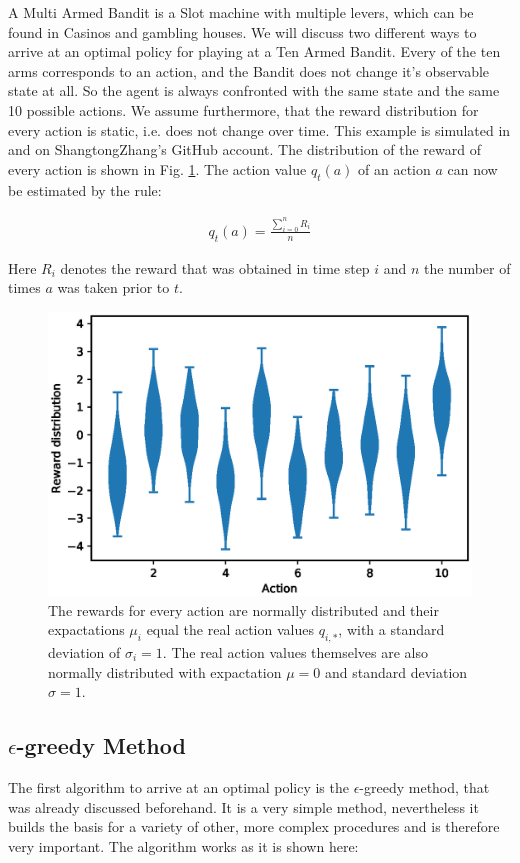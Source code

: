 \documentclass[paper=a4, fontsize=11pt]{scrartcl} %
\numberwithin{equation}{section} %
\numberwithin{figure}{section} %
\numberwithin{table}{section} %
\begin{document}
	A Multi Armed Bandit is a Slot machine with multiple levers, which can be found in Casinos and gambling houses. We will discuss two different ways to arrive at an optimal policy for playing at a Ten Armed Bandit. Every of the ten arms corresponds to an action, and the Bandit does not change it's observable state at all. So the agent is always confronted with the same state and the same 10 possible actions. We assume furthermore, that the reward distribution for every action is static, i.e. does not change over time. This example is simulated in \cite{SuttonBarto} and on ShangtongZhang's GitHub account\cite{ShangtongZhang}. The distribution of the reward of every action is shown in Fig. \ref{fig:rewarddist}. The action value $q_t(a)$ of an action $a$ can now be estimated by the rule:

\begin{align}
q_t(a) = \frac{ \sum_{i=0}^n R_i}{n}
\label{eq:estactval}
\end{align}

	Here $R_i$ denotes the reward that was obtained in time step $i$ and $n$ the number of times $a$ was taken prior to $t$.

\begin{figure}[H]
\centering
\includegraphics[width=0.6\linewidth]{Images/figure_2_1.eps}
\caption{\cite{ShangtongZhang} The rewards for every action are normally distributed and their expactations $\mu_i$ equal the real action values $q_{i,*}$, with a standard deviation of $\sigma_i = 1$. The real action values themselves are also normally distributed with expactation $\mu = 0$ and standard deviation $\sigma = 1$.}
\label{fig:rewarddist}
\end{figure}

\subsection{$\epsilon$-greedy Method}

	The first algorithm to arrive at an optimal policy is the $\epsilon$-greedy method, that was already discussed beforehand. It is a very simple method, nevertheless it builds the basis for a variety of other, more complex procedures and is therefore very important. The algorithm works as it is shown here:
\end{document}
